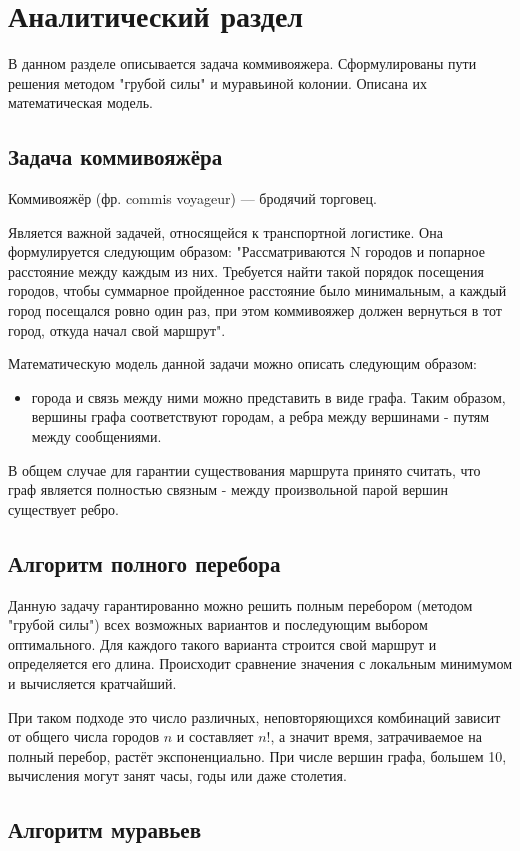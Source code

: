 \chapter{Аналитический раздел}
В данном разделе описывается задача коммивояжера. Сформулированы пути решения методом "грубой силы" и муравьиной колонии. Описана их математическая модель. 

\section{Задача коммивояжёра}
Коммивояжёр (фр. commis voyageur) — бродячий торговец.

Является важной задачей, относящейся к транспортной логистике. Она формулируется следующим образом: "Рассматриваются N городов и попарное расстояние между каждым из них. Требуется найти такой порядок посещения городов, чтобы суммарное пройденное расстояние было минимальным, а каждый город посещался ровно один раз, при этом коммивояжер должен вернуться в тот город, откуда начал свой маршрут".

Математическую модель данной задачи можно описать следующим образом:
\begin{itemize}
	\item города и связь между ними можно представить в виде графа. Таким образом, вершины графа соответствуют городам, а ребра между вершинами - путям между сообщениями. 
\end{itemize}

В общем случае для гарантии существования маршрута принято считать, что граф является полностью связным - между произвольной парой вершин существует ребро.


\section{Алгоритм полного перебора}
Данную задачу гарантированно можно решить полным перебором (методом "грубой силы") всех возможных вариантов и последующим выбором оптимального. Для каждого такого варианта строится свой маршрут и определяется его длина. Происходит сравнение значения с локальным минимумом и вычисляется кратчайший. 

При таком подходе это число различных, неповторяющихся комбинаций зависит от общего числа городов $n$ и составляет $n!$, а значит время, затрачиваемое на полный перебор, растёт экспоненциально. При числе вершин графа, большем 10, вычисления могут занят часы, годы или даже столетия.

\section{Алгоритм муравьев}
